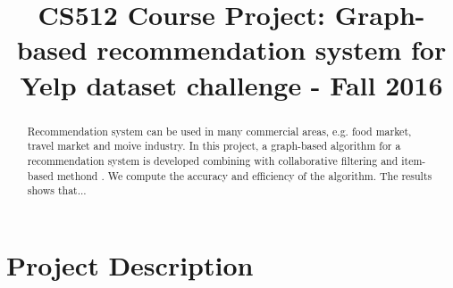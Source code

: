 \documentclass[10pt,conference]{IEEEtran}
\begin{document}
\title{CS512 Course Project: Graph-based recommendation system for Yelp dataset challenge - Fall 2016}
\author{



}

\maketitle
\begin{abstract}
\textnormal{
Recommendation system can be used in many commercial areas, e.g. food market, travel market and moive industry. In this project, a graph-based algorithm for a recommendation system is developed combining with collaborative filtering and item-based methond . We compute the accuracy and efficiency of the algorithm. The results shows that...
}
\end{abstract}

\IEEEpeerreviewmaketitle
\section{Project Description}\label{sec:1. Project Description}

\end{document}
